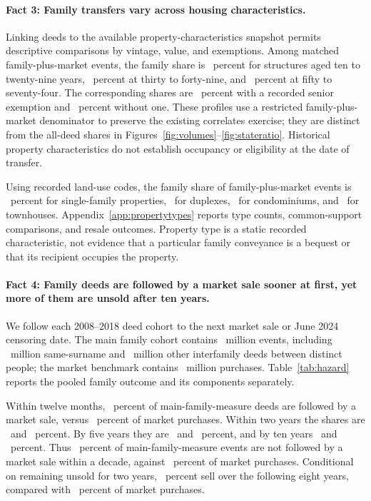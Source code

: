 \paragraph{Fact 3: Family transfers vary across housing characteristics.}
Linking deeds to the available property-characteristics snapshot permits descriptive comparisons by vintage, value, and exemptions. Among matched family-plus-market events, the family share is \AgeShareYoung\ percent for structures aged ten to twenty-nine years, \AgeShareMiddle\ percent at thirty to forty-nine, and \AgeShareOlder\ percent at fifty to seventy-four. The corresponding shares are \SeniorShareYes\ percent with a recorded senior exemption and \SeniorShareNo\ percent without one. These profiles use a restricted family-plus-market denominator to preserve the existing correlates exercise; they are distinct from the all-deed shares in Figures~\ref{fig:volumes}--\ref{fig:stateratio}. Historical property characteristics do not establish occupancy or eligibility at the date of transfer.

Using recorded land-use codes, the family share of family-plus-market events is \TypeShareSF\ percent for single-family properties, \TypeShareDuplex\ for duplexes, \TypeShareCondo\ for condominiums, and \TypeShareTownhouse\ for townhouses. Appendix~\ref{app:propertytypes} reports type counts, common-support comparisons, and resale outcomes. Property type is a static recorded characteristic, not evidence that a particular family conveyance is a bequest or that its recipient occupies the property.

\paragraph{Fact 4: Family deeds are followed by a market sale sooner at first, yet more of them are unsold after ten years.}
We follow each 2008--2018 deed cohort to the next market sale or June 2024 censoring date. The main family cohort contains \MainCohortMillion\ million events, including \SurnameCohortMillion\ million same-surname and \OtherFamilyCohortMillion\ million other interfamily deeds between distinct people; the market benchmark contains \MarketCohortMillion\ million purchases. Table~\ref{tab:hazard} reports the pooled family outcome and its components separately.

Within twelve months, \MainSoldOne\ percent of main-family-measure deeds are followed by a market sale, versus \MarketSoldOne\ percent of market purchases. Within two years the shares are \FamilySoldTwo\ and \MarketSoldTwo\ percent. By five years they are \FamilySoldFive\ and \MarketSoldFive\ percent, and by ten years \FamilySoldTen\ and \MarketSoldTen\ percent. Thus \FamilyRetainedTen\ percent of main-family-measure events are not followed by a market sale within a decade, against \SIIIMarketUnsoldTen\ percent of market purchases. Conditional on remaining unsold for two years, \FamilyConditionalSold\ percent sell over the following eight years, compared with \MarketConditionalSold\ percent of market purchases.

